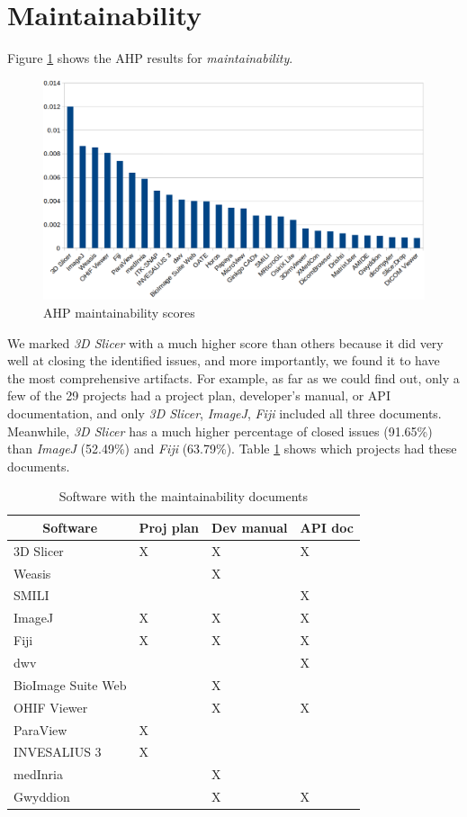 \section{Maintainability}
\label{sec_score_maintainability}
Figure \ref{fg_maintainability_scores} shows the AHP results for \textit{maintainability}. 

\begin{figure}[H]
\includegraphics[scale=0.38]{figures/maintainability_scores.png}
\caption{AHP maintainability scores}
\label{fg_maintainability_scores}
\end{figure}

We marked \textit{3D Slicer} with a much higher score than others because it did very well at closing the identified issues, and more importantly, we found it to have the most comprehensive artifacts. For example, as far as we could find out, only a few of the 29 projects had a project plan, developer's manual, or API documentation, and only \textit{3D Slicer}, \textit{ImageJ}, \textit{Fiji} included all three documents. Meanwhile, \textit{3D Slicer} has a much higher percentage of closed issues (91.65\%) than \textit{ImageJ} (52.49\%) and \textit{Fiji} (63.79\%). Table \ref{tab_maintainability_docs} shows which projects had these documents.

\begin{table}[H]
\centering
\begin{tabular}{llll}
\hline
\multicolumn{1}{c}{Software} & Proj plan & Dev manual & API doc \\ \hline
3D Slicer & X & X & X \\
Weasis &  & X &  \\
SMILI &  &  & X \\
ImageJ & X & X & X \\
Fiji & X & X & X \\
dwv &  &  & X \\
BioImage Suite Web &  & X &  \\
OHIF Viewer &  & X & X \\
ParaView & X &  &  \\
INVESALIUS 3 & X &  &  \\
medInria &  & X &  \\
Gwyddion &  & X & X \\ \hline
\end{tabular}
\caption{\label{tab_maintainability_docs}Software with the maintainability documents}
\end{table}

